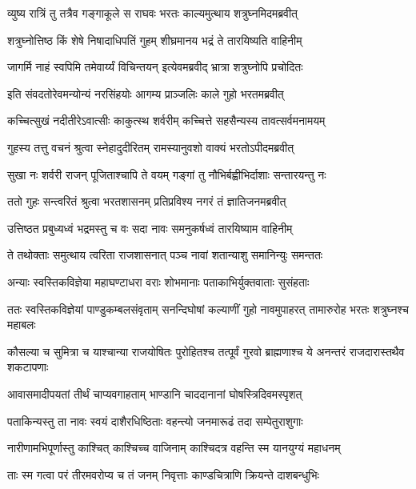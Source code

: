 
\twolineshloka
{व्युष्य रात्रिं तु तत्रैव गङ्गाकूले स राघवः}
{भरतः काल्यमुत्थाय शत्रुघ्नमिदमब्रवीत्} %

\twolineshloka
{शत्रुघ्नोत्तिष्ठ किं शेषे निषादाधिपतिं गुहम्}
{शीघ्रमानय भद्रं ते तारयिष्यति वाहिनीम्} %

\twolineshloka
{जागर्मि नाहं स्वपिमि तमेवार्य्यं विचिन्तयन्}
{इत्येवमब्रवीद् भ्रात्रा शत्रुघ्नोपि प्रचोदितः} %

\twolineshloka
{इति संवदतोरेवमन्योन्यं नरसिंहयोः}
{आगम्य प्राञ्जलिः काले गुहो भरतमब्रवीत्} %

\twolineshloka
{कच्चित्सुखं नदीतीरेऽवात्सीः काकुत्स्थ शर्वरीम्}
{कच्चित्ते सहसैन्यस्य तावत्सर्वमनामयम्} %

\twolineshloka
{गुहस्य तत्तु वचनं श्रुत्वा स्नेहादुदीरितम्}
{रामस्यानुवशो वाक्यं भरतोऽपीदमब्रवीत्} %

\twolineshloka
{सुखा नः शर्वरी राजन् पूजिताश्चापि ते वयम्}
{गङ्गां तु नौभिर्बह्वीभिर्दाशाः सन्तारयन्तु नः} %

\twolineshloka
{ततो गुहः सन्त्वरितं श्रुत्वा भरतशासनम्}
{प्रतिप्रविश्य नगरं तं ज्ञातिजनमब्रवीत्} %

\twolineshloka
{उत्तिष्ठत प्रबुध्यध्वं भद्रमस्तु च वः सदा}
{नावः समनुकर्षध्वं तारयिष्याम वाहिनीम्} %

\twolineshloka
{ते तथोक्ताः समुत्थाय त्वरिता राजशासनात्}
{पञ्च नावां शतान्याशु समानिन्युः समन्ततः} %

\twolineshloka
{अन्याः स्वस्तिकविज्ञेया महाघण्टाधरा वराः}
{शोभमानाः पताकाभिर्युक्तवाताः सुसंहताः} %

\threelineshloka
{ततः स्वस्तिकविज्ञेयां पाण्डुकम्बलसंवृताम्}
{सनन्दिघोषां कल्याणीं गुहो नावमुपाहरत्}
{तामारुरोह भरतः शत्रुघ्नश्च महाबलः} %

\threelineshloka
{कौसल्या च सुमित्रा च याश्चान्या राजयोषितः}
{पुरोहितश्च तत्पूर्वं गुरवो ब्राह्मणाश्च ये}
{अनन्तरं राजदारास्तथैव शकटापणाः} %

\twolineshloka
{आवासमादीपयतां तीर्थं चाप्यवगाहताम्}
{भाण्डानि चाददानानां घोषस्त्रिदिवमस्पृशत्} %

\twolineshloka
{पताकिन्यस्तु ता नावः स्वयं दाशैरधिष्ठिताः}
{वहन्त्यो जनमारूढं तदा सम्पेतुराशुगाः} %

\twolineshloka
{नारीणामभिपूर्णास्तु काश्चित् काश्चिच्च वाजिनाम्}
{काश्चिदत्र वहन्ति स्म यानयुग्यं महाधनम्} %

\twolineshloka
{ताः स्म गत्वा परं तीरमवरोप्य च तं जनम्}
{निवृत्ताः काण्डचित्राणि क्रियन्ते दाशबन्धुभिः} %

